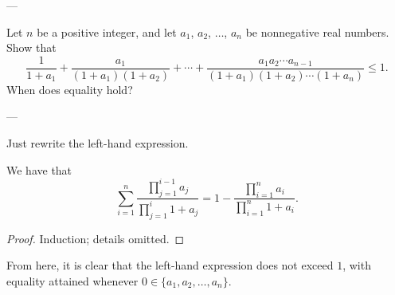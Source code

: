 
---

Let $n$ be a positive integer, and let $a_1$, $a_2$, $\ldots$, $a_n$ be nonnegative real numbers. Show that \[\frac1{1+a_1}+\frac{a_1}{(1+a_1)(1+a_2)}+\cdots+\frac{a_1a_2\cdots a_{n-1}}{(1+a_1)(1+a_2)\cdots(1+a_n)}\le1.\]
When does equality hold?

---

Just rewrite the left-hand expression.
\begin{iclaim*}
    We have that \[\sum_{i=1}^n\frac{\prod_{j=1}^{i-1}a_j}{\prod_{j=1}^i1+a_j}=1-\frac{\prod_{i=1}^na_i}{\prod_{i=1}^n1+a_i}.\]
\end{iclaim*}
\begin{proof}
    Induction; details omitted.
\end{proof}

From here, it is clear that the left-hand expression does not exceed $1$, with equality attained whenever $0\in\{a_1,a_2,\ldots,a_n\}$.
